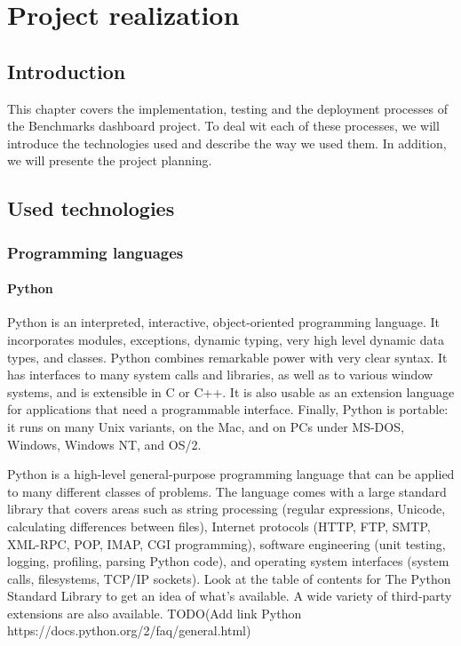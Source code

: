 \chapter{Project realization}
\section{Introduction}
This chapter covers the implementation, testing and the deployment processes of
the Benchmarks dashboard project. To deal wit each of these processes, we will
introduce the technologies used and describe the way we used them. In
addition, we will presente the project planning.
\pagebreak

\section{Used technologies}
\subsection{Programming languages}
\subsubsection{Python}
Python is an interpreted, interactive, object-oriented programming language. It
incorporates modules, exceptions, dynamic typing, very high level dynamic data
types, and classes. Python combines remarkable power with very clear syntax. It
has interfaces to many system calls and libraries, as well as to various window
systems, and is extensible in C or C++. It is also usable as an extension
language for applications that need a programmable interface. Finally, Python is
portable: it runs on many Unix variants, on the Mac, and on PCs under MS-DOS,
Windows, Windows NT, and OS/2.

Python is a high-level general-purpose programming language that can be applied
to many different classes of problems. The language comes with a large standard
library that covers areas such as string processing (regular expressions,
Unicode, calculating differences between files), Internet protocols (HTTP, FTP,
SMTP, XML-RPC, POP, IMAP, CGI programming), software engineering (unit testing,
logging, profiling, parsing Python code), and operating system interfaces
(system calls, filesystems, TCP/IP sockets). Look at the table of contents for
The Python Standard Library to get an idea of what’s available. A wide variety
of third-party extensions are also available.
TODO(Add link Python https://docs.python.org/2/faq/general.html)

